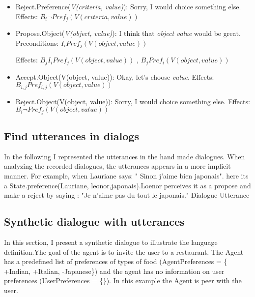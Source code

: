 \documentclass{llncs}
\begin{document}
\begin{itemize}
 \item Reject.Preference(\textit{V(criteria, value)}): Sorry, I would choice something else.
    \subitem Effects:  $B_{i} \neg  Pref_{j}(V(criteria, value))$
 
  \item Propose.Object(\textit{V(object, value)}): I think that \textit{object value} would be great.
  \subitem Preconditions:  $ I_{i} Pref_{j}(V(object, value))$
  
  \subitem Effects:  $B_{j} I_{i} Pref_{j}(V(object, value))$ ,  $ B_{j} Pref_{i}(V(object, value))$  
  \item Accept.Object(V(object, value)): Okay, let's choose \textit{value}.
     \subitem Effects:  $B_{i,j} Pref_{i,j}(V(object, value))$ 
  
  \item Reject.Object(V(object, value)): Sorry, I would choice something else.
      \subitem Effects:  $B_{i} \neg  Pref_{j}(V(object, value))$
 \end{itemize} 
 \subsection{Find utterances in dialogs}	
 
 In the following I represented the utterances in the hand made dialogues. When analyzing the recorded dialogues, the utterances appears in a more implicit manner. For example, when Lauriane says: " Sinon j'aime bien japonais". here its a State.preference(Lauriane, leonor,japonais).Loenor perceives it as a propose and make a reject by saying : "Je n'aime pas du tout le japonais."
 Dialogue	Utterance

 \subsection{Synthetic dialogue with utterances}
 In this section, I present a synthetic dialogue to illustrate the language definition.Yhe goal of the agent is to invite the user to a restaurant. The Agent has a predefined list of preferences of types of food (AgentPreferences = \{ +Indian, +Italian, -Japanese\}) and the agent has no information on user preferences (UserPreferences = \{\}). In this example the Agent is peer with the user. 
\end{document}

